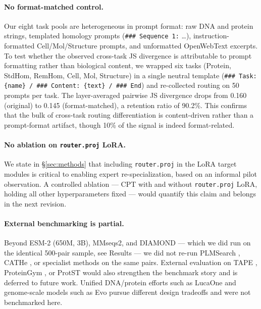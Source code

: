 \documentclass[11pt]{article}
\begin{document}
\paragraph{No format-matched control.} Our eight task pools are heterogeneous in prompt format: raw DNA and protein strings, templated homology prompts (\texttt{\#\#\# Sequence 1:} \ldots), instruction-formatted Cell/Mol/Structure prompts, and unformatted OpenWebText excerpts. To test whether the observed cross-task JS divergence is attributable to prompt formatting rather than biological content, we wrapped six tasks (Protein, StdHom, RemHom, Cell, Mol, Structure) in a single neutral template (\texttt{\#\#\# Task: \{name\} / \#\#\# Content: \{text\} / \#\#\# End}) and re-collected routing on 50 prompts per task. The layer-averaged pairwise JS divergence drops from 0.160 (original) to 0.145 (format-matched), a retention ratio of 90.2\%. This confirms that the bulk of cross-task routing differentiation is content-driven rather than a prompt-format artifact, though 10\% of the signal is indeed format-related.

\paragraph{No ablation on \texttt{router.proj} LoRA.} We state in \S\ref{sec:methods} that including \texttt{router.proj} in the LoRA target modules is critical to enabling expert re-specialization, based on an informal pilot observation. A controlled ablation --- CPT with and without \texttt{router.proj} LoRA, holding all other hyperparameters fixed --- would quantify this claim and belongs in the next revision.

\paragraph{External benchmarking is partial.} Beyond ESM-2 (650M, 3B), MMseqs2, and DIAMOND --- which we did run on the identical 500-pair sample, see Results --- we did not re-run PLMSearch \citep{liu2024plmsearch}, CATHe \citep{nallapareddy2023cathe}, or specialist methods on the same pairs. External evaluation on TAPE \citep{rao2019tape}, ProteinGym \citep{notin2023proteingym}, or ProtST \citep{xu2023protst} would also strengthen the benchmark story and is deferred to future work. Unified DNA/protein efforts such as LucaOne \citep{he2024lucaone} and genome-scale models such as Evo \citep{nguyen2024evo, brixi2026evo2} pursue different design tradeoffs and were not benchmarked here.
\end{document}
